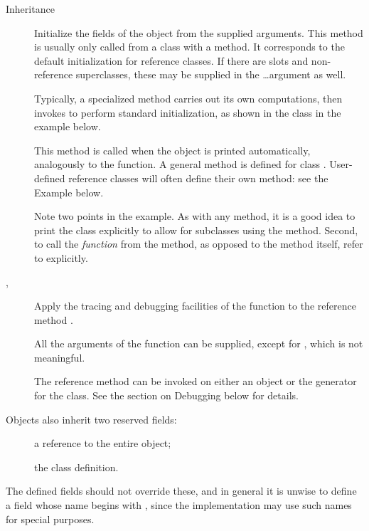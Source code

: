 \begin{Section}{Inheritance}
\begin{description}
\item[]  
Initialize the fields of the object from the supplied arguments.  This
method is usually only called from a class with a 
method.  It corresponds to the default initialization for reference
classes.  If there are slots and non-reference superclasses, these may
be supplied in the \dots argument as well.

Typically, a specialized 
method carries out its own computations, then invokes 
to perform standard initialization, as shown in the
 class in the example below.


\item[]  
This method is called when the object is printed automatically,
analogously to the  function.  A general method is
defined for class .  User-defined reference
classes will often define their own method: see the Example below.

Note two points in the example.  As with any  method, it
is a good idea to print the class explicitly to allow for subclasses
using the method.  Second, to call the \emph{function} 
from the method, as opposed to the  
method itself, refer to  explicitly.


\item[,  ] 
Apply the tracing and debugging facilities of the 
function to the reference method .

All the arguments of the 
function can be supplied, except for , which is not
meaningful.

The reference method can be invoked on either an object or the
generator for the class.  See the section on Debugging below for details.


\end{description}
 

Objects also inherit two reserved fields:
\begin{description}

\item[] 
a reference to the entire object;

\item[] 
the class definition.


\end{description}
 
The defined fields should not override these, and in general it is
unwise to define a field whose name begins with , since the
implementation may use such names for special purposes.

\end{Section}
